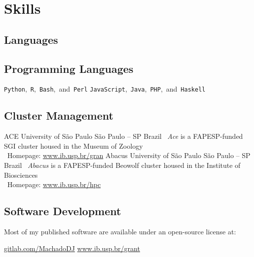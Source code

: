 
\section{Skills}

\subsection{Languages}



\subsection{Programming Languages}

		{\small \texttt{Python},~\texttt{R},~\texttt{Bash},~and~\texttt{Perl}}
		{\small \texttt{JavaScript},~\texttt{Java},~\texttt{PHP},~and~\texttt{Haskell}}

\subsection{Cluster Management}

		{ACE}
		{University of São Paulo}
		{São Paulo -- SP}
		{Brazil}
		{
			\textbullet~\emph{Ace} is a FAPESP-funded SGI cluster housed in the Museum of Zoology\\
			\textbullet~Homepage: \href{https://www.ib.usp.br/grant/anfibios/researchHPC.html}{www.ib.usp.br/gran}
		}
		{Abacus}
		{University of São Paulo}
		{São Paulo -- SP}
		{Brazil}
		{
			\textbullet~\emph{Abacus} is a FAPESP-funded Beowolf cluster housed in the Institute of Biosciences\\
			\textbullet~Homepage: \href{https://www.ib.usp.br/hpc/}{www.ib.usp.br/hpc}
		}

\subsection{Software Development}

	\begin{flushleft}
		{Most of my published software are available under an open-source license at:}
	\end{flushleft}

		{\href{https://gitlab.com/MachadoDJ}{gitlab.com/MachadoDJ}}
		{\href{http://www.ib.usp.br/grant/anfibios/researchSoftware.html}{www.ib.usp.br/grant}}
